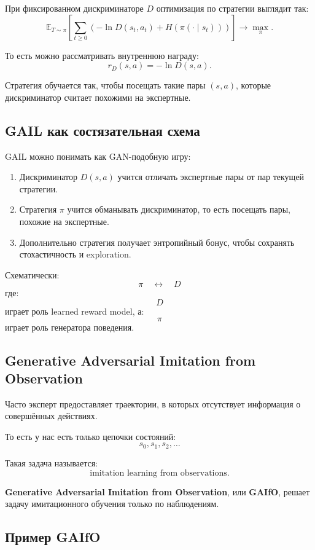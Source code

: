 \documentclass[12pt,a4paper]{article}
\begin{document}
При фиксированном дискриминаторе $D$ оптимизация по стратегии выглядит так:
\[
\mathbb E_{T\sim\pi}
\left[
\sum_{t\ge 0}
\left(
-\ln D(s_t,a_t)
+
H(\pi(\cdot\mid s_t))
\right)
\right]
\to
\max_\pi.
\]

То есть можно рассматривать внутреннюю награду:
\[
r_D(s,a)
=
-\ln D(s,a).
\]

Стратегия обучается так, чтобы посещать такие пары $(s,a)$, которые дискриминатор считает похожими на экспертные.

\subsection{GAIL как состязательная схема}

GAIL можно понимать как GAN-подобную игру:

\begin{enumerate}
    \item Дискриминатор $D(s,a)$ учится отличать экспертные пары от пар текущей стратегии.
    \item Стратегия $\pi$ учится обманывать дискриминатор, то есть посещать пары, похожие на экспертные.
    \item Дополнительно стратегия получает энтропийный бонус, чтобы сохранять стохастичность и exploration.
\end{enumerate}

Схематически:
\[
\pi
\quad
\longleftrightarrow
\quad
D
\]
где:
\[
D
\]
играет роль learned reward model, а:
\[
\pi
\]
играет роль генератора поведения.

\subsection{Generative Adversarial Imitation from Observation}

Часто эксперт предоставляет траектории, в которых отсутствует информация о совершённых действиях.

То есть у нас есть только цепочки состояний:
\[
s_0,s_1,s_2,\ldots
\]

Такая задача называется:
\[
\text{imitation learning from observations}.
\]

\textbf{Generative Adversarial Imitation from Observation}, или \textbf{GAIfO}, решает задачу имитационного обучения только по наблюдениям.

\subsection{Пример GAIfO}
\end{document}
